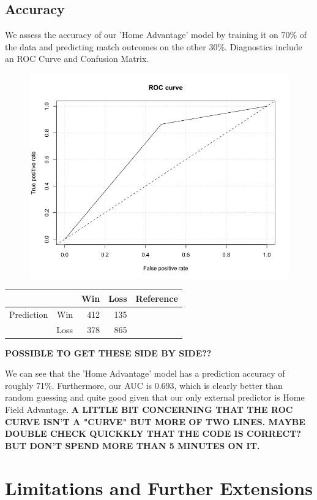 \documentclass{article}
\begin{document}
\subsection{Accuracy}

We assess the accuracy of our 'Home Advantage' model by training it on 70\% of the data and predicting match outcomes on the other 30\%. Diagnostics include an ROC Curve and Confusion Matrix.

\begin{figure}[H]
\centering
\includegraphics[width=.5\linewidth]{figures/roccurve.png}
\label{fig:sub1}
\end{figure}

\begin{table}[H]
\centering
\begin{tabular}{rrrrr}
  \hline
 & & Win &  Loss & Reference\\ 
  \hline
Prediction & Win  & 412 & 135 & \\
& Loss & 378 & 865 & \\
   \hline
\end{tabular}
\end{table}

\textbf{POSSIBLE TO GET THESE SIDE BY SIDE??}

We can see that the 'Home Advantage' model has a prediction accuracy of roughly 71\%. Furthermore, our AUC is 0.693, which is clearly better than random guessing and quite good given that our only external predictor is Home Field Advantage. \textbf{A LITTLE BIT CONCERNING THAT THE ROC CURVE ISN'T A "CURVE" BUT MORE OF TWO LINES. MAYBE DOUBLE CHECK QUICKKLY THAT THE CODE IS CORRECT? BUT DON'T SPEND MORE THAN 5 MINUTES ON IT.}

\section{Limitations and Further Extensions}
\end{document}
